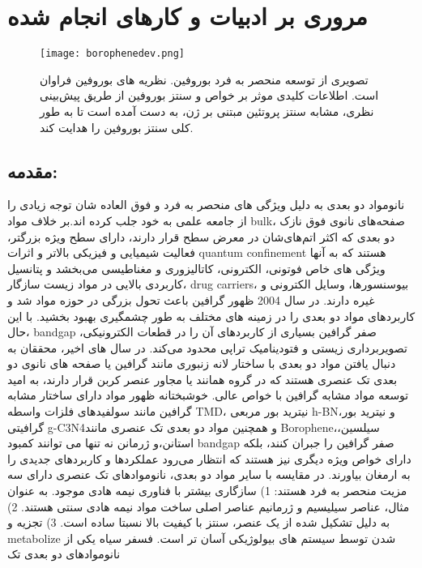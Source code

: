 \chapter{مروری بر ادبیات و کار‌های انجام شده}
\clearpage
\begin{figure*}[!ht]
    \centering
    \texttt{[image: borophenedev.png]}
    \caption{تصویری از توسعه منحصر به فرد بوروفین. نظریه های بوروفین فراوان است. اطلاعات کلیدی موثر بر خواص و سنتز بوروفین از طریق پیش‌بینی نظری، مشابه سنتز پروتئین مبتنی بر ژن، به دست آمده است تا به طور کلی سنتز بوروفین را هدایت کند.}
    \label{fig:borophenedev}
\end{figure*}
\section{مقدمه:}
نانومواد دو بعدی به دلیل ویژگی های منحصر به فرد و فوق العاده شان توجه زیادی را از جامعه علمی به خود جلب کرده اند.\cite{huangGraphenebasedComposites2012, huangGrapheneBasedMaterialsSynthesis2011}بر خلاف مواد \gls{bulk}، صفحه‌های نانوی فوق نازک دو بعدی که اکثر اتم‌های‌شان در معرض سطح قرار دارند، دارای سطح ویژه بزرگتر، فعالیت شیمیایی و فیزیکی بالاتر و اثرات \gls{quantum confinement} هستند که به آنها ویژگی های خاص فوتونی، الکترونی، کاتالیزوری و مغناطیسی می‌بخشد و پتانسیل کاربردی بالایی در مواد زیست سازگار، \gls{drug carriers}، بیوسنسورها، وسایل الکترونی و غیره دارند.\cite{lu2DTransitionMetalDichalcogenideNanosheetBasedComposites2016, chhowallaChemistryTwodimensionalLayered2013, sunElectronicStructuresSiC2008} در سال 2004 ظهور گرافین باعث تحول بزرگی در حوزه مواد شد و کاربردهای مواد دو بعدی را در زمینه های مختلف به طور چشمگیری بهبود بخشید. \cite{novoselovElectricFieldEffect2004, geimRiseGraphene2007} با این حال، \gls{bandgap} صفر گرافین بسیاری از کاربردهای آن را در قطعات الکترونیکی، تصویربرداری زیستی و فتودینامیک تراپی محدود می‌کند. در سال های اخیر، محققان به دنبال یافتن مواد دو بعدی با ساختار لانه زنبوری مانند گرافین یا صفحه های نانوی دو بعدی تک عنصری هستند که در گروه همانند یا مجاور عنصر کربن قرار دارند، به امید توسعه مواد مشابه گرافین با خواص عالی. خوشبختانه ظهور مواد دارای ساختار مشابه گرافین مانند سولفیدهای فلزات واسطه \gls{TMD}\cite{dingDefectEngineeredBioactive2019, liRatiometricImmunoassaysBuilt2019}، نیترید بور مربعی \gls{h-BN}\cite{deanBoronNitrideSubstrates2010}،و نیترید بور گرافیتی \gls{g-C3N4}\cite{caoPolymericPhotocatalystsBased2015}و همچنین مواد دو بعدی تک عنصری مانند \gls{Borophene}\cite{fengExperimentalRealizationTwodimensional2016}،سیلسین\cite{fengEvidenceSiliceneHoneycomb2012,chenEvidenceDiracFermions2012,duTuningBandGap2014}، استانن\cite{gouStraininducedBandEngineering2017, zhuEpitaxialGrowthTwodimensional2015}،و ژرمانن \cite{niTunableBandgapSilicene2012} نه تنها می توانند کمبود \gls{bandgap} صفر گرافین را جبران کنند، بلکه دارای خواص ویژه دیگری نیز هستند که انتظار می‌رود عملکردها و کاربردهای جدیدی را به ارمغان بیاورند. در مقایسه با سایر مواد دو بعدی، نانوموادهای تک عنصری دارای سه مزیت منحصر به فرد هستند: 1) سازگاری بیشتر با فناوری نیمه هادی موجود. به عنوان مثال، عناصر سیلیسیم و ژرمانیم عناصر اصلی ساخت مواد نیمه هادی سنتی هستند. 2) به دلیل تشکیل شده از یک عنصر، سنتز با کیفیت بالا نسبتا ساده است. 3) تجزیه و \gls{metabolize} شدن توسط سیستم های بیولوژیکی آسان تر است. فسفر سیاه یکی از نانوموادهای دو بعدی تک 